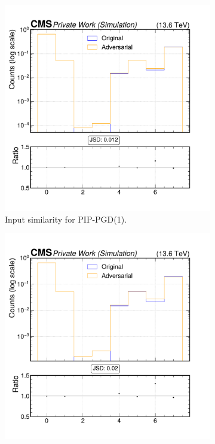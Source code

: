 \begin{figure}[h]
  \centering
  \begin{subfigure}[t]{0.32\textwidth}
    \includegraphics[width=\linewidth]{media/output/features/compare/combined_it_1/cmp_cpf_arr_Cpfcan_VTX_ass.pdf}
    \caption*{Input similarity for PIP-PGD(1).}
  \end{subfigure}\hfill
  \begin{subfigure}[t]{0.32\textwidth}
    \includegraphics[width=\linewidth]{media/output/features/compare/combined_it_2/cmp_cpf_arr_Cpfcan_VTX_ass.pdf}

\end{subfigure}
\end{figure}

